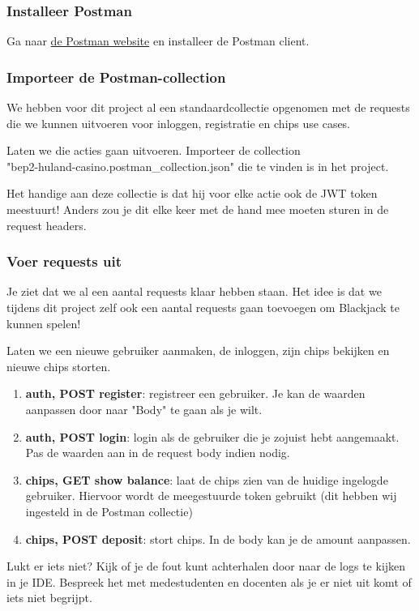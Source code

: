 \subsubsection{Installeer Postman}
Ga naar \href{https://www.postman.com/downloads/}{de Postman website} 
en installeer de Postman client.

\subsubsection{Importeer de Postman-collection}
We hebben voor dit project al een standaardcollectie opgenomen met 
de requests die we kunnen uitvoeren voor inloggen, registratie en 
chips use cases.

Laten we die acties gaan uitvoeren. Importeer de collection
\\ "bep2-huland-casino.postman\_collection.json" die te 
vinden is in het project.

Het handige aan deze collectie is dat hij voor elke actie ook 
de JWT token meestuurt! Anders zou je dit elke keer met de hand 
mee moeten sturen in de request headers.

\subsubsection{Voer requests uit}
Je ziet dat we al een aantal requests klaar hebben staan.
Het idee is dat we tijdens dit project zelf ook een aantal requests
gaan toevoegen om Blackjack te kunnen spelen!

Laten we een nieuwe gebruiker aanmaken, de inloggen, zijn chips bekijken en nieuwe chips storten.
\begin{enumerate}
    \item \textbf{auth, POST register}: registreer een gebruiker.
    Je kan de waarden aanpassen door naar "Body" te gaan als je wilt.
    \item \textbf{auth, POST login}: login als de gebruiker die je zojuist
    hebt aangemaakt. Pas de waarden aan in de request body indien nodig.
    \item \textbf{chips, GET show balance}: laat de chips zien van de huidige 
    ingelogde gebruiker. Hiervoor wordt de meegestuurde token gebruikt
    (dit hebben wij ingesteld in de Postman collectie)
    \item \textbf{chips, POST deposit}: stort chips.
    In de body kan je de amount aanpassen.
\end{enumerate}

Lukt er iets niet? Kijk of je de fout kunt achterhalen door 
naar de logs te kijken in je IDE. Bespreek het met medestudenten 
en docenten als je er niet uit komt of iets niet begrijpt.

